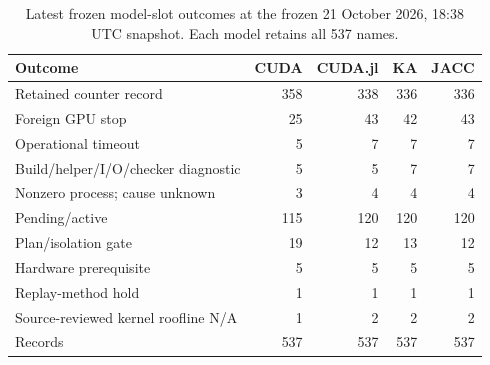 \begin{table}[t]
\centering\small
\caption{Latest frozen model-slot outcomes at the frozen 21 October 2026, 18:38 UTC snapshot. Each model retains all 537 names.}
\label{tab:roofline-failures-latest}
\begin{tabular}{lrrrr}
\toprule
Outcome & CUDA & CUDA.jl & KA & JACC \\
\midrule
Retained counter record & 358 & 338 & 336 & 336 \\
Foreign GPU stop & 25 & 43 & 42 & 43 \\
Operational timeout & 5 & 7 & 7 & 7 \\
Build/helper/I/O/checker diagnostic & 5 & 5 & 7 & 7 \\
Nonzero process; cause unknown & 3 & 4 & 4 & 4 \\
Pending/active & 115 & 120 & 120 & 120 \\
Plan/isolation gate & 19 & 12 & 13 & 12 \\
Hardware prerequisite & 5 & 5 & 5 & 5 \\
Replay-method hold & 1 & 1 & 1 & 1 \\
Source-reviewed kernel roofline N/A & 1 & 2 & 2 & 2 \\
\midrule
Records & 537 & 537 & 537 & 537 \\
\bottomrule
\end{tabular}
\end{table}
